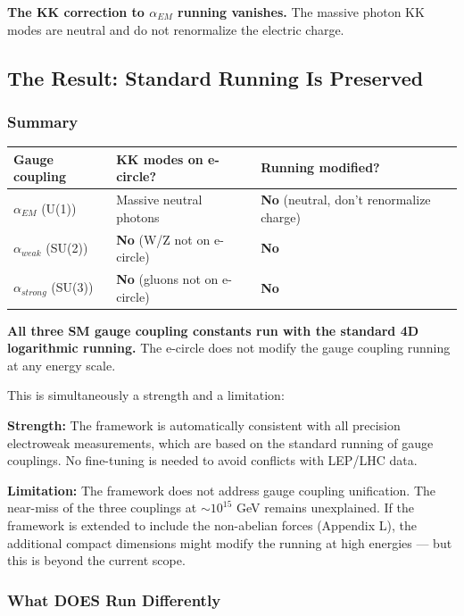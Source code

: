 \documentclass[aps,prd,preprint,superscriptaddress,longbibliography,floatfix]{revtex4-2}
\theoremstyle{remark}
\begin{document}
\textbf{The KK correction to $\alpha_{EM}$ running vanishes.} The massive photon KK modes are neutral and do not renormalize the electric charge.



\subsection{The Result: Standard Running Is Preserved}


\subsubsection{Summary}


\begin{table}[H]
\begin{ruledtabular}
\begin{tabular}{p{5.0cm}p{5.0cm}p{5.0cm}}
Gauge coupling & KK modes on e-circle? & Running modified? \\
\hline
$\alpha_{EM}$ (U(1)) & Massive neutral photons & \textbf{No} (neutral, don't renormalize charge) \\
$\alpha_{weak}$ (SU(2)) & \textbf{No} (W/Z not on e-circle) & \textbf{No} \\
$\alpha_{strong}$ (SU(3)) & \textbf{No} (gluons not on e-circle) & \textbf{No} \\
\end{tabular}
\end{ruledtabular}
\end{table}

\textbf{All three SM gauge coupling constants run with the standard 4D logarithmic running.} The e-circle does not modify the gauge coupling running at any energy scale.

This is simultaneously a strength and a limitation:

\textbf{Strength:} The framework is automatically consistent with all precision electroweak measurements, which are based on the standard running of gauge couplings. No fine-tuning is needed to avoid conflicts with LEP/LHC data.

\textbf{Limitation:} The framework does not address gauge coupling unification. The near-miss of the three couplings at $\sim 10^{15}$ GeV remains unexplained. If the framework is extended to include the non-abelian forces (Appendix L), the additional compact dimensions might modify the running at high energies --- but this is beyond the current scope.


\subsubsection{What DOES Run Differently}
\end{document}
